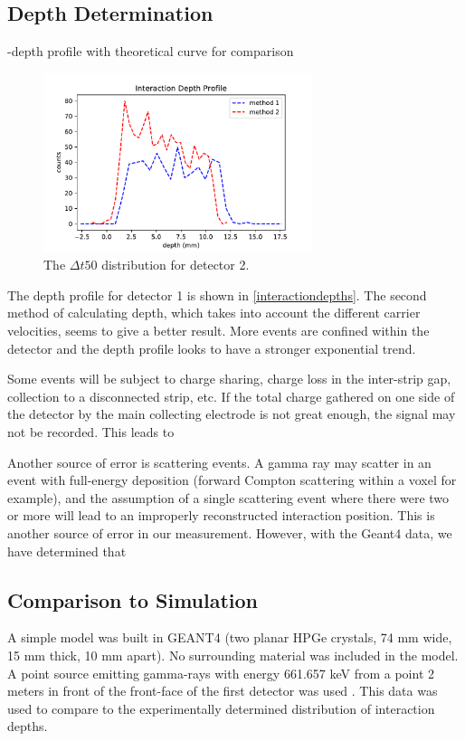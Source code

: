 \subsection{Depth Determination}

-depth profile with theoretical curve for comparison

\begin{figure}[h]
\begin{centering}
\includegraphics[width=0.7\textwidth]{./figures/interactiondepths.pdf}
\caption{The $\Delta t50$ distribution for detector 2.}
\label{t50_2}
\end{centering}
\end{figure}

The depth profile for detector 1 is shown in \ref{interactiondepths}. The second method of calculating depth, which takes into account the different carrier velocities, seems to give a better result. More events are confined within the detector and the depth profile looks to have a stronger exponential trend.

Some events will be subject to charge sharing, charge loss in the inter-strip gap, collection to a disconnected strip, etc. If the total charge gathered on one side of the detector by the main collecting electrode is not great enough, the signal may not be recorded. This leads to 

Another source of error is scattering events. A gamma ray may scatter in an event with full-energy deposition (forward Compton scattering within a voxel for example), and the assumption of a single scattering event where there were two or more will lead to an improperly reconstructed interaction position. This is another source of error in our measurement. However, with the Geant4 data, we have determined that 

\subsection{Comparison to Simulation}

A simple model was built in GEANT4 (two planar HPGe crystals, 74 mm wide, 15 mm thick, 10 mm apart). No surrounding material was included in the model. A point source emitting gamma-rays with energy 661.657 keV from a point 2 meters in front of the front-face of the first detector was used \cite{ebss}. This data was used to compare to the experimentally determined distribution of interaction depths.